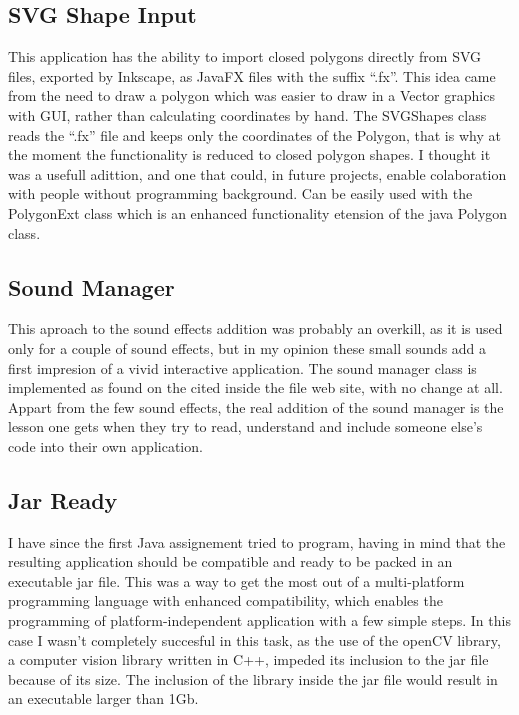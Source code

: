 \documentclass[a4paper, 11pt]{paper}
\begin{document}
\subsection{SVG Shape Input}
\indent\par
This application has the ability to import closed polygons directly from SVG files,
exported by Inkscape, as JavaFX files with the suffix ``.fx''. This idea came from the need to draw a
polygon which was easier to draw in a Vector graphics with GUI, rather than calculating coordinates by hand.
The SVGShapes class reads the ``.fx'' file and keeps only the coordinates of the Polygon, that is why at the moment
the functionality is reduced to closed polygon shapes.
I thought it was a usefull adittion, and one that could, in future projects, enable
colaboration with people without programming background. Can be easily used with the PolygonExt class which is an enhanced functionality etension of the java Polygon class.\\

\subsection{Sound Manager}
\indent\par
This aproach to the sound effects addition was probably an overkill, as it is used only for a couple of
sound effects, but in my opinion these small sounds add a first impresion of a vivid interactive application.
The sound manager class is implemented as found on the cited inside the file web site, with no change at all.
Appart from the few sound effects, the real addition of the sound manager is the lesson one gets when they try to
read, understand and include someone else's code into their own application. \\

\subsection{Jar Ready}
\indent\par
I have since the first Java assignement tried to program, having in mind that the resulting application
should be compatible and ready to be packed in an executable jar file. This was a way to get the most out of
a multi-platform programming language with enhanced compatibility, which enables the programming of
platform-independent application with a few simple steps. In this case I wasn't completely succesful in this task,
as the use of the openCV library, a computer vision library written in C++,
impeded its inclusion to the jar file because of its size.
The inclusion of the library inside the jar file would result in an executable larger than 1Gb. \\
\end{document}
